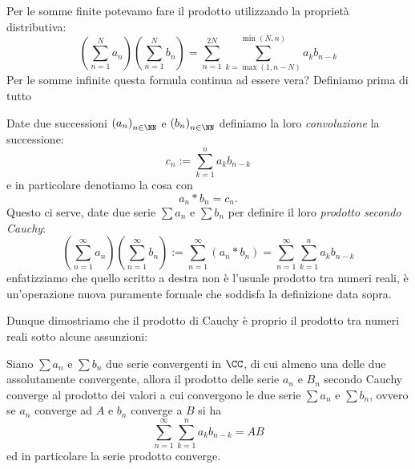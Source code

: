 \documentclass[11pt]{scrartcl}
\begin{document}
	Per le somme finite potevamo fare il prodotto utilizzando la proprietà distributiva:
	$$\left(\sum_{n=1}^{N}a_n\right)\left(\sum_{n=1}^{N}b_n\right)=\sum_{n=1}^{2N}\sum_{k=\max\left(1,n-N\right)}^{\min\left(N,n\right)}a_kb_{n-k}$$
	Per le somme infinite questa formula continua ad essere vera? Definiamo prima di tutto
	\begin{definition}
		Date due successioni $\left(a_n\right)_{n\in\NN}$ e $\left(b_n\right)_{n\in\NN}$ definiamo la loro \textit{convoluzione} la successione:
		$$c_n:=\sum_{k=1}^{n}a_{k}b_{n-k}$$
		e in particolare denotiamo la cosa con
		$$a_n* b_n=c_n.$$
		Questo ci serve, date due serie $\sum a_n$ e $\sum b_n$ per definire il loro \textit{prodotto secondo Cauchy}:
		$$\left(\sum_{n=1}^{\infty}a_n\right)\left(\sum_{n=1}^{\infty}b_n\right):=\sum_{n=1}^{\infty}\left(a_n* b_n\right)=\sum_{n=1}^{\infty}\sum_{k=1}^{n}a_k b_{n-k}$$
		enfatizziamo che quello scritto a destra non è l'usuale prodotto tra numeri reali, è un'operazione nuova puramente formale che soddisfa la definizione data sopra.
	\end{definition}
	Dunque dimostriamo che il prodotto di Cauchy è proprio il prodotto tra numeri reali sotto alcune assunzioni:
	\begin{theorem}[Mertens]
		Siano $\sum a_n$ e $\sum b_n$ due serie convergenti in $\CC$, di cui almeno una delle due assolutamente convergente, allora il prodotto delle serie $a_n$ e $B_n$ secondo Cauchy converge al prodotto dei valori a cui convergono le due serie $\sum a_n$ e $\sum b_n$, ovvero se $a_n$ converge ad $A$ e $b_n$ converge a $B$ si ha
		$$\sum_{n=1}^{\infty}\sum_{k=1}^{n}a_{k}b_{n-k}=AB$$
		ed in particolare la serie prodotto converge.
	\end{theorem}
\end{document}
